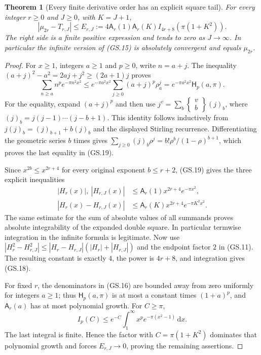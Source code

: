 \documentclass[11pt]{article}
\newtheorem{theorem}{Theorem}
\newcommand{\dd}{\,\mathrm d}
\begin{document}
\begin{theorem}[Every finite derivative order has an explicit square tail]
For every integer $r\ge0$ and $J\ge0$, with $K=J+1$,
\begin{equation}
 |\mu_{2r}-T_{r,J}|\le E_{r,J}:=
 4\mathsf A_r(1)\mathsf A_r(K)
 I_{4r+8}(\pi(1+K^2)).\tag{GS.18}
\end{equation}
The right side is a finite positive expression and tends to zero as
$J\to\infty$. In particular the infinite version of (GS.15) is
absolutely convergent and equals $\mu_{2r}$.
\end{theorem}
\begin{proof}
For $x\ge1$, integers $a\ge1$ and $p\ge0$, write $n=a+j$.
The inequality $(a+j)^2-a^2=2aj+j^2\ge(2a+1)j$ proves
\begin{equation}
 \sum_{n\ge a}n^p e^{-\pi n^2x^2}
 \le e^{-\pi a^2x^2}\sum_{j\ge0}(a+j)^p\rho_a^j
 =e^{-\pi a^2x^2}\mathsf H_p(a,\pi).\tag{GS.19}
\end{equation}
For the equality, expand $(a+j)^p$ and then use
$j^v=\sum_b\left\{\begin{smallmatrix}v\\b\end{smallmatrix}\right\}(j)_b$,
where $(j)_b=j(j-1)\cdots(j-b+1)$. This identity follows
inductively from $j(j)_b=(j)_{b+1}+b(j)_b$ and the displayed
Stirling recurrence. Differentiating the geometric series $b$
times gives
$\sum_{j\ge0}(j)_b\rho^j=b!\rho^b/(1-\rho)^{b+1}$,
which proves the last equality in (GS.19).

Since $x^{2b}\le x^{2r+4}$ for every original exponent $b\le r+2$,
(GS.19) gives the three explicit inequalities
\begin{align*}
 |H_r(x)|,\ |H_{r,J}(x)|
 &\le\mathsf A_r(1)x^{2r+4}e^{-\pi x^2},\\
 |H_r(x)-H_{r,J}(x)|
 &\le\mathsf A_r(K)x^{2r+4}e^{-\pi K^2x^2}.
\end{align*}
The same estimate for the sum of absolute values of all summands
proves absolute integrability of the expanded double square. In
particular termwise integration in the infinite formula is legitimate.
Now use $|H_r^2-H_{r,J}^2|\le|H_r-H_{r,J}|(|H_r|+|H_{r,J}|)$
and the endpoint factor $2$ in (GS.11). The resulting constant is
exactly $4$, the power is $4r+8$, and integration gives (GS.18).

For fixed $r$, the denominators in (GS.16) are bounded away from
zero uniformly for integers $a\ge1$; thus $\mathsf H_p(a,\pi)$
is at most a constant times $(1+a)^p$, and $\mathsf A_r(a)$
has at most polynomial growth. For $C\ge\pi$,
\[
 I_p(C)\le e^{-C}\int_1^\infty x^p e^{-\pi(x^2-1)}\dd x.
\]
The last integral is finite. Hence the factor with
$C=\pi(1+K^2)$ dominates that polynomial growth and forces
$E_{r,J}\to0$, proving the remaining assertions.
\end{proof}
\end{document}
